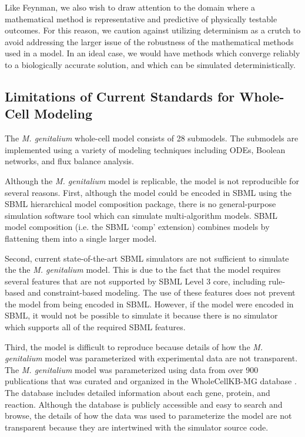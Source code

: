 \documentclass[journal,transmag,twoside]{IEEEtran}
\newcommand{\karrcomment}[2]{\pdfmarkupcomment[markup=Highlight,color=yellow,author={Jonathan Karr}]{#1}{#2}}
\begin{document}
Like Feynman, we also wish to draw attention to the domain where a mathematical method
is representative and predictive of physically testable outcomes.
For this reason, we caution against utilizing determinism as a crutch to avoid
addressing the larger issue of the robustness of the mathematical methods used in a model.
In an ideal case, we would have methods which converge reliably to a biologically accurate
solution, and which can be simulated deterministically.

\subsection{Limitations of Current Standards for Whole-Cell Modeling}

The \textit{M. genitalium} whole-cell model \cite{Karr2012} consists of 28 submodels.
The submodels are implemented using a variety of modeling techniques including
ODEs, Boolean networks, and flux balance analysis.

Although the \textit{M. genitalium} model is replicable, the model is not reproducible for several reasons. First,
although the model could be encoded in SBML using the SBML hierarchical model composition package, there is no 
general-purpose simulation software tool which can simulate multi-algorithm models. SBML
model composition (i.e. the SBML `comp' extension) combines models by flattening them into a single larger model.

Second, current state-of-the-art SBML simulators are not sufficient to simulate the the \textit{M. genitalium} model. This is due to the fact that
the model requires several features
that are not supported by SBML Level 3 core, including rule-based and constraint-based modeling.
The use of these features does not prevent the model from being encoded in SBML. However, if the model were encoded in SBML,
it would not be possible to simulate it because there is no simulator which supports all of the
required SBML features.

Third, the model is difficult to reproduce because details of how the \textit{M. genitalium} model was parameterized with
experimental data are not transparent. The \textit{M. genitalium} model was parameterized using data from over 900 
publications that was curated and organized in the WholeCellKB-MG database \cite{karr2013wholecellkb}. The database 
includes detailed information about each gene, protein, and reaction. Although the database is publicly accessible and
easy to search and browse, the details of how the data was used to parameterize the model are not transparent 
because they are intertwined with the simulator source code.
\end{document}
